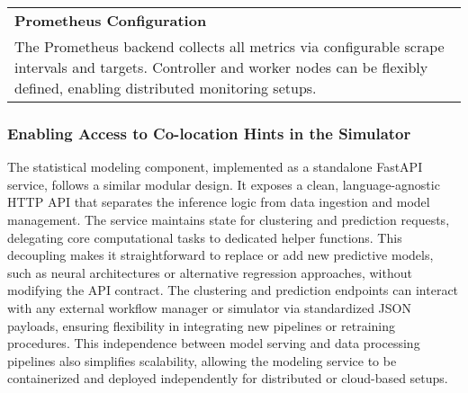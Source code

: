 \begin{table}[H]
{\begin{tabular}{
            p{3.5cm}
            >{\centering\arraybackslash}p{2cm}
            p{5cm}
            p{6cm}
            }
            \midrule
            \multicolumn{4}{l}{\textbf{Prometheus Configuration}}                                                                                                                                                                             \\[3pt]
            \multicolumn{4}{p{16.5cm}}{
                The Prometheus backend collects all metrics via configurable scrape intervals and targets. Controller and worker nodes can be flexibly defined, enabling distributed monitoring setups.
            }                                                                                                                                                                                                                                 \\

            \bottomrule
        \end{tabular}
    }
\end{table}

\subsubsection{Enabling Access to Co-location Hints in the Simulator}
\label{sec:statistical_modeling}
The statistical modeling component, implemented as a standalone FastAPI service, follows a similar modular design. It exposes a clean, language-agnostic HTTP API that separates the inference logic from data ingestion and model management. The service maintains state for clustering and prediction requests, delegating core computational tasks to dedicated helper functions. This decoupling makes it straightforward to replace or add new predictive models, such as neural architectures or alternative regression approaches, without modifying the API contract. The clustering and prediction endpoints can interact with any external workflow manager or simulator via standardized JSON payloads, ensuring flexibility in integrating new pipelines or retraining procedures. This independence between model serving and data processing pipelines also simplifies scalability, allowing the modeling service to be containerized and deployed independently for distributed or cloud-based setups.


